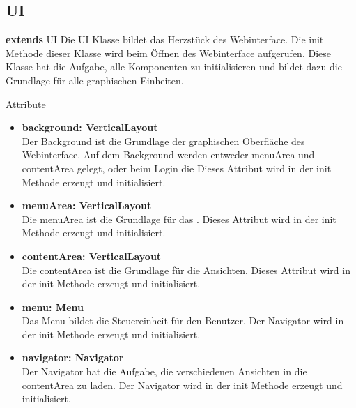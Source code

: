 \newpage
\subsection{UI}\label{UI}
\textbf{extends}  UI \newline
Die UI Klasse bildet das Herzstück des Webinterface. Die init Methode dieser Klasse wird beim Öffnen des Webinterface aufgerufen. Diese Klasse hat die Aufgabe, alle Komponenten zu initialisieren und bildet dazu die Grundlage für alle graphischen Einheiten.
\newline

\underline{Attribute}
\begin{itemize}
\itemsep0pt

\item \textbf{background: VerticalLayout} \hfill\\ 
Der Background ist die Grundlage der graphischen Oberfläche des Webinterface. Auf dem Background werden entweder menuArea und contentArea gelegt, oder beim Login die  Dieses Attribut wird in der init Methode erzeugt und initialisiert.

\item \textbf{menuArea: VerticalLayout} \hfill\\ 
Die menuArea ist die Grundlage für das . Dieses Attribut wird in der init Methode erzeugt und initialisiert.

\item \textbf{contentArea: VerticalLayout} \hfill\\ 
Die contentArea ist die Grundlage für die Ansichten. Dieses Attribut wird in der init Methode erzeugt und initialisiert.

\item \textbf{menu: Menu} \hfill\\ 
Das Menu bildet die Steuereinheit für den Benutzer. Der Navigator wird in der init Methode erzeugt und initialisiert.

\item \textbf{navigator: Navigator} \hfill\\ 
Der Navigator hat die Aufgabe, die verschiedenen Ansichten in die contentArea zu laden. Der Navigator wird in der init Methode erzeugt und initialisiert.

\end{itemize}


